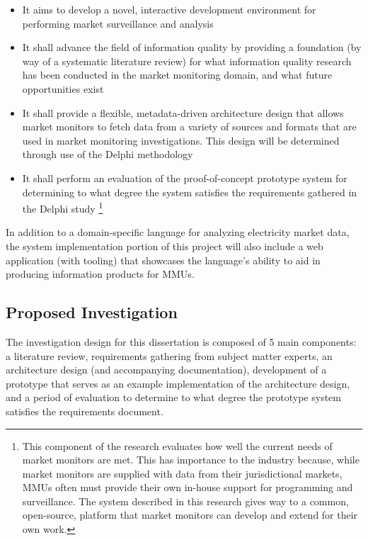 \begin{itemize}
    \item{It aims to develop a novel, interactive development environment for performing market surveillance and analysis}
    \item{It shall advance the field of information quality by providing a foundation (by way of a systematic literature review) for what information quality research has been conducted in the market monitoring domain, and what future opportunities exist}
    \item{It shall provide a flexible, metadata-driven architecture design that allows market monitors to fetch data from a variety of sources and formats that are used in market monitoring investigations. This design will be determined through use of the Delphi methodology}
    \item{It shall perform an evaluation of the proof-of-concept prototype system for determining to what degree the system satisfies the requirements gathered in the Delphi study \footnote{This component of the research evaluates how well the current needs of market monitors are met. This has importance to the industry because, while market monitors are supplied with data from their jurisdictional markets, MMUs often must provide their own in-house support for programming and surveillance. The system described in this research gives way to a common, open-source, platform that market monitors can develop and extend for their own work.}}
\end{itemize}

In addition to a domain-specific language for analyzing electricity market data, the system implementation portion of this project will also include a web application (with tooling) that showcases the language's ability to aid in producing information products for MMUs.

\subsection{Proposed Investigation}

The investigation design for this dissertation is composed of 5 main components: a literature review, requirements gathering from subject matter experts, an architecture design (and accompanying documentation), development of a prototype that serves as an example implementation of the architecture design, and a period of evaluation to determine to what degree the prototype system satisfies the requirements document.

